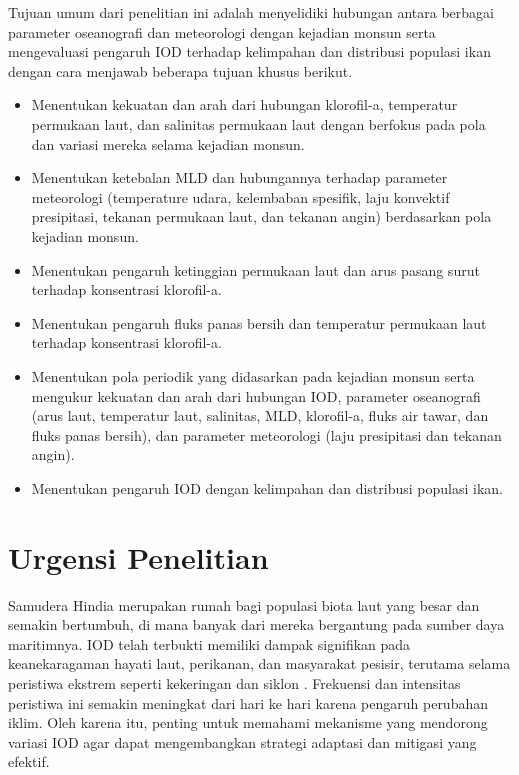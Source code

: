 \begin{spacing}{1.5}
	Tujuan umum dari penelitian ini adalah menyelidiki hubungan antara berbagai parameter oseanografi dan meteorologi dengan kejadian monsun serta mengevaluasi pengaruh IOD terhadap kelimpahan dan distribusi populasi ikan dengan cara menjawab beberapa tujuan khusus berikut.
	
	\begin{itemize}
		\item  Menentukan kekuatan dan arah dari hubungan klorofil-a, temperatur permukaan laut, dan salinitas permukaan laut dengan berfokus pada pola dan variasi mereka selama kejadian monsun.
		
		\item Menentukan ketebalan MLD dan hubungannya terhadap parameter meteorologi (temperature udara, kelembaban spesifik, laju konvektif presipitasi, tekanan permukaan laut, dan tekanan angin) berdasarkan pola kejadian monsun.
		
		\item Menentukan pengaruh ketinggian permukaan laut dan arus pasang surut terhadap konsentrasi klorofil-a.
		
		\item Menentukan pengaruh fluks panas bersih dan temperatur permukaan laut terhadap konsentrasi klorofil-a.
		
		\item Menentukan pola periodik yang didasarkan pada kejadian monsun serta mengukur kekuatan dan arah dari hubungan IOD, parameter oseanografi (arus laut, temperatur laut, salinitas, MLD, klorofil-a, fluks air tawar, dan fluks panas bersih), dan parameter meteorologi (laju presipitasi dan tekanan angin).
		
		\item Menentukan pengaruh IOD dengan kelimpahan dan distribusi populasi ikan.
		
	\end{itemize}
	\section[Urgensi Penelitian]{Urgensi Penelitian}

	Samudera Hindia merupakan rumah bagi populasi biota laut yang besar dan semakin bertumbuh, di mana banyak dari mereka bergantung pada sumber daya maritimnya. IOD telah terbukti memiliki dampak signifikan pada keanekaragaman hayati laut, perikanan, dan masyarakat pesisir, terutama selama peristiwa ekstrem seperti kekeringan \cite{Pan2018} dan siklon \cite{Wahiduzzaman2022}. Frekuensi dan intensitas peristiwa ini semakin meningkat dari hari ke hari karena pengaruh perubahan iklim. Oleh karena itu, penting untuk memahami mekanisme yang mendorong variasi IOD agar dapat mengembangkan strategi adaptasi dan mitigasi yang efektif.
	

\end{spacing}
